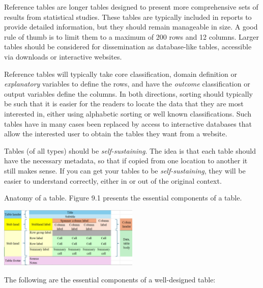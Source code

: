 \documentclass[
  12pt,
]{book}
\begin{document}
Reference tables are longer tables designed to present more comprehensive sets of results from statistical studies. These tables are typically included in reports to provide detailed information, but they should remain manageable in size. A good rule of thumb is to limit them to a maximum of 200 rows and 12 columns. Larger tables should be considered for dissemination as database-like tables, accessible via downloads or interactive websites.

Reference tables will typically take core classification, domain definition or \emph{explanatory} variables to define the rows, and have the \emph{outcome} classification or output variables define the columns. In both directions, sorting should typically be such that it is easier for the readers to locate the data that they are most interested in, either using alphabetic sorting or well known classifications. Such tables have in many cases been replaced by access to interactive databases that allow the interested user to obtain the tables they want from a website.

Tables (of all types) should be \emph{self-sustaining}. The idea is that each table should have the necessary metadata, so that if copied from one location to another it still makes sense. If you can get your tables to be \emph{self-sustaining}, they will be easier to understand correctly, either in or out of the original context.

Anatomy of a table. Figure 9.1 presents the essential components of a table.

\includegraphics[width=0.5\textwidth,height=\textheight]{pics/Table1.jpg}

The following are the essential components of a well-designed table:
\end{document}
